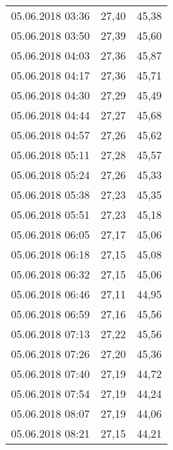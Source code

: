 \documentclass[a4paper,11pt,twoside]{article}
\begin{document}
\begin{longtable}[c]{ccc}
05.06.2018 03:36       & 27,40                & 45,38                          \\
05.06.2018 03:50       & 27,39                & 45,60                          \\
05.06.2018 04:03       & 27,36                & 45,87                          \\
05.06.2018 04:17       & 27,36                & 45,71                          \\
05.06.2018 04:30       & 27,29                & 45,49                          \\
05.06.2018 04:44       & 27,27                & 45,68                          \\
05.06.2018 04:57       & 27,26                & 45,62                          \\
05.06.2018 05:11       & 27,28                & 45,57                          \\
05.06.2018 05:24       & 27,26                & 45,33                          \\
05.06.2018 05:38       & 27,23                & 45,35                          \\
05.06.2018 05:51       & 27,23                & 45,18                          \\
05.06.2018 06:05       & 27,17                & 45,06                          \\
05.06.2018 06:18       & 27,15                & 45,08                          \\
05.06.2018 06:32       & 27,15                & 45,06                          \\
05.06.2018 06:46       & 27,11                & 44,95                          \\
05.06.2018 06:59       & 27,16                & 45,56                          \\
05.06.2018 07:13       & 27,22                & 45,56                          \\
05.06.2018 07:26       & 27,20                & 45,36                          \\
05.06.2018 07:40       & 27,19                & 44,72                          \\
05.06.2018 07:54       & 27,19                & 44,24                          \\
05.06.2018 08:07       & 27,19                & 44,06                          \\
05.06.2018 08:21       & 27,15                & 44,21                          \\

\end{longtable}
\end{document}
